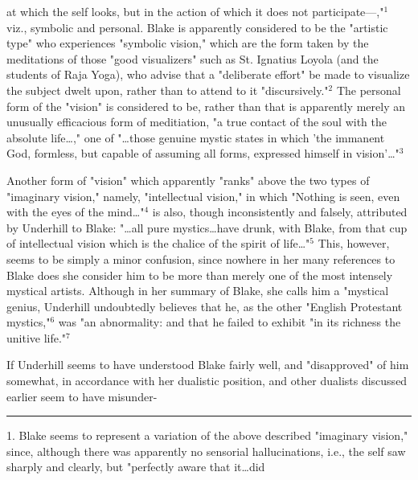 \noindent at which the self looks, but in the action
of which it does not participate---,"$^{1}$ viz., symbolic and
personal. Blake is apparently considered to be the "artistic type" who
experiences "symbolic vision," which are the form taken by the
meditations of those "good visualizers" such as St. Ignatius Loyola (and the students of Raja Yoga),
who advise that a "deliberate effort" be made to visualize the subject dwelt upon, rather than to attend
to it "discursively."$^{2}$ The personal form of the "vision" is considered to be, rather than
that is apparently merely an unusually efficacious form of meditiation, "a true contact of the soul with
the absolute life\dots," one of "\dots those genuine mystic states in which 'the immanent God, formless, but capable
of assuming all forms, expressed himself in vision'\dots"$^{3}$\par
\vspace*{0.5\baselineskip}
Another form of "vision" which apparently "ranks" above the
two types of "imaginary vision," namely, "intellectual vision," in
which "Nothing is seen, even with the eyes of the mind\dots"$^{4}$ is also, though
inconsistently and falsely, attributed by Underhill to Blake: "\dots all pure mystics\dots have drunk, with Blake, from
that cup of intellectual vision which is the chalice of the spirit of life\dots"$^{5}$ This, however, seems to be simply a
minor confusion, since nowhere in her many references to Blake does she consider him to be more than merely one of the most
intensely mystical artists. Although in her summary of Blake, she calls him a "mystical genius, Underhill undoubtedly believes that
he, as the other "English Protestant mystics,"$^{6}$ was "an abnormality: and that he failed to exhibit "in its richness
the unitive life."$^{7}$\par
\vspace*{0.5\baselineskip}
If Underhill seems to have understood Blake fairly well, and "disapproved" of him somewhat, in accordance with her
dualistic position, and other dualists discussed earlier seem to have misunder-\linebreak
\null\par
\vspace*{-\baselineskip}
\vspace*{\fill}
\noindent\rule{0.25\textwidth}{0.4pt}\par
1. Blake seems to represent a variation of the above described "imaginary vision," since, although there was
apparently no sensorial hallucinations, i.e., the self saw sharply and clearly, but "perfectly aware that it\dots did
